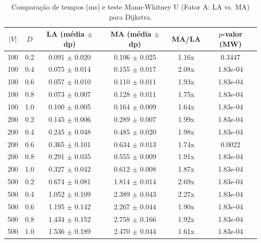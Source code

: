 \begin{table}[htbp]
\centering
\caption{Comparação de tempos (ms) e teste Mann-Whitney U (Fator A: LA vs. MA) para Dijkstra.}
\label{tab:fator_a_dijkstra}
\begin{tabular}{cccccc}
\hline
$|V|$ & $D$ & LA (média $\pm$ dp) & MA (média $\pm$ dp) & MA/LA & $p$-valor (MW) \\
\hline
100 & 0.2 & 0.091 $\pm$ 0.020 & 0.106 $\pm$ 0.025 & 1.16x & 0.3447 \\
100 & 0.4 & 0.075 $\pm$ 0.014 & 0.155 $\pm$ 0.017 & 2.08x & 1.83e-04 \\
100 & 0.6 & 0.057 $\pm$ 0.010 & 0.110 $\pm$ 0.011 & 1.93x & 1.83e-04 \\
100 & 0.8 & 0.073 $\pm$ 0.007 & 0.128 $\pm$ 0.011 & 1.75x & 1.83e-04 \\
100 & 1.0 & 0.100 $\pm$ 0.005 & 0.164 $\pm$ 0.009 & 1.64x & 1.83e-04 \\
200 & 0.2 & 0.145 $\pm$ 0.006 & 0.289 $\pm$ 0.007 & 1.99x & 1.83e-04 \\
200 & 0.4 & 0.245 $\pm$ 0.048 & 0.485 $\pm$ 0.020 & 1.98x & 1.83e-04 \\
200 & 0.6 & 0.365 $\pm$ 0.101 & 0.634 $\pm$ 0.013 & 1.74x & 0.0022 \\
200 & 0.8 & 0.291 $\pm$ 0.035 & 0.555 $\pm$ 0.009 & 1.91x & 1.83e-04 \\
200 & 1.0 & 0.327 $\pm$ 0.042 & 0.612 $\pm$ 0.008 & 1.87x & 1.83e-04 \\
500 & 0.2 & 0.674 $\pm$ 0.081 & 1.814 $\pm$ 0.014 & 2.69x & 1.83e-04 \\
500 & 0.4 & 1.052 $\pm$ 0.109 & 2.389 $\pm$ 0.043 & 2.27x & 1.83e-04 \\
500 & 0.6 & 1.195 $\pm$ 0.142 & 2.267 $\pm$ 0.044 & 1.90x & 1.83e-04 \\
500 & 0.8 & 1.434 $\pm$ 0.152 & 2.758 $\pm$ 0.166 & 1.92x & 1.83e-04 \\
500 & 1.0 & 1.536 $\pm$ 0.189 & 2.470 $\pm$ 0.044 & 1.61x & 1.83e-04 \\
\hline
\end{tabular}
\end{table}